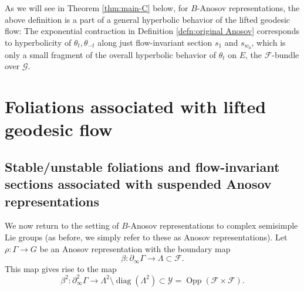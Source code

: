 \documentclass[12pt]{amsbook}%
\theoremstyle{definition}
\theoremstyle{remark}
\numberwithin{section}{chapter}
\numberwithin{subsection}{section}
\numberwithin{figure}{chapter}
\DeclareMathOperator{\Opp}{Opp}
\DeclareMathOperator{\diag}{diag}
\def\cF{{\mathscr{F}}}
\def\cY{{\mathscr{Y}}}
\def\Ga{\Gamma}
\def\La{\Lambda}
\def\geo{\partial_\infty}
\def\cG{{\mathscr{G}}}
\def\kap{}
\begin{document}
{{As we will see in Theorem \ref{thm:main-C} below, for $B$-Anosov representations, the 
above definition is a part of a general hyperbolic behavior of the lifted geodesic flow: The exponential contraction in  Definition 
\ref{defn:original Anosov} corresponds to hyperbolicity of $\theta_t, \theta_{-t}$ along just flow-invariant section $s_{1}$ and  
$s_{w_0}$, which is only a small fragment of the overall hyperbolic behavior of $\theta_t$ on $E$, the $\cF$-bundle over $\cG$. 

\section{Foliations associated with lifted geodesic flow}\label{sec:Hyperbolicity of flows}

%


\subsection{Stable/unstable foliations and flow-invariant sections associated with suspended Anosov representations} 
\label{sec:def_flow_section}

We now return to the setting of $B$-Anosov representations to complex semisimple Lie groups (as before, we simply refer to these as Anosov representations). Let $\rho: \Ga\to G$ be an Anosov representation with the boundary map 
$$
\beta: \geo \Ga\to \La\subset \cF.$$
This map gives rise to the map 
$$
\beta^{2}: \geo^2 \Ga\to \La^2\setminus \diag(\La^2)\subset \cY=\Opp(\cF\times \cF).$$

}}
\end{document}
